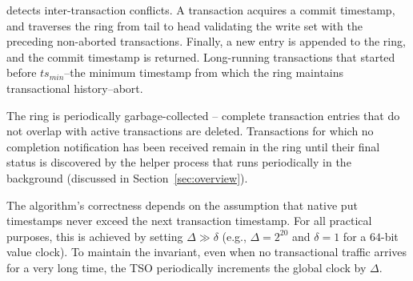  detects inter-transaction conflicts. A transaction
acquires a commit timestamp,
and traverses the ring from tail to head
validating the write set with the preceding non-aborted transactions.
Finally, a new entry is appended to the ring,
and the commit timestamp is returned.
Long-running transactions that started before $ts_{min}$--the minimum timestamp
from which the ring maintains transactional history--abort.

The ring is periodically garbage-collected -- complete transaction entries that do not 
overlap with active transactions are deleted. Transactions for which no completion 
notification has been received remain in the ring until their final status is discovered 
by the helper process that runs periodically in the background
(discussed in Section~\ref{sec:overview}).

The algorithm's correctness
depends on the assumption
that native put timestamps never exceed the next transaction timestamp.  
For all practical purposes, this is achieved by setting $\Delta \gg \delta$ 
(e.g., $\Delta=2^{20}$ and $\delta=1$ for a $64$-bit value clock). 
To maintain the invariant, even when no transactional traffic arrives for a
very long time, the TSO periodically increments the global clock by
$\Delta$.



